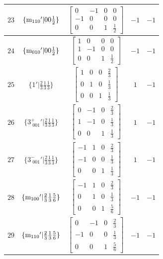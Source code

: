 \documentclass[fleqn,8pt]{jsarticle}
\begin{document}
\begin{longtable}{ccccc}
$ 23 $ & $ \{{\rm m}_{110}{}'|0 0 \frac{1}{2}\} $ & $ \begin{bmatrix} 0 & -1 & 0 & 0 \\ -1 & 0 & 0 & 0 \\ 0 & 0 & 1 & \frac{1}{2} \end{bmatrix} $ & $ -1 $ & $ -1 $ \\ \hline
$ 24 $ & $ \{{\rm m}_{010}{}'|0 0 \frac{1}{2}\} $ & $ \begin{bmatrix} 1 & 0 & 0 & 0 \\ 1 & -1 & 0 & 0 \\ 0 & 0 & 1 & \frac{1}{2} \end{bmatrix} $ & $ -1 $ & $ -1 $ \\ \hline
$ 25 $ & $ \{1{}'|\frac{2}{3} \frac{1}{3} \frac{1}{3}\} $ & $ \begin{bmatrix} 1 & 0 & 0 & \frac{2}{3} \\ 0 & 1 & 0 & \frac{1}{3} \\ 0 & 0 & 1 & \frac{1}{3} \end{bmatrix} $ & $ 1 $ & $ -1 $ \\ \hline
$ 26 $ & $ \{3^{+}_{\,\,001}{}'|\frac{2}{3} \frac{1}{3} \frac{1}{3}\} $ & $ \begin{bmatrix} 0 & -1 & 0 & \frac{2}{3} \\ 1 & -1 & 0 & \frac{1}{3} \\ 0 & 0 & 1 & \frac{1}{3} \end{bmatrix} $ & $ 1 $ & $ -1 $ \\ \hline
$ 27 $ & $ \{3^{-}_{\,\,001}{}'|\frac{2}{3} \frac{1}{3} \frac{1}{3}\} $ & $ \begin{bmatrix} -1 & 1 & 0 & \frac{2}{3} \\ -1 & 0 & 0 & \frac{1}{3} \\ 0 & 0 & 1 & \frac{1}{3} \end{bmatrix} $ & $ 1 $ & $ -1 $ \\ \hline
$ 28 $ & $ \{{\rm m}_{100}{}'|\frac{2}{3} \frac{1}{3} \frac{5}{6}\} $ & $ \begin{bmatrix} -1 & 1 & 0 & \frac{2}{3} \\ 0 & 1 & 0 & \frac{1}{3} \\ 0 & 0 & 1 & \frac{5}{6} \end{bmatrix} $ & $ -1 $ & $ -1 $ \\ \hline
$ 29 $ & $ \{{\rm m}_{110}{}'|\frac{2}{3} \frac{1}{3} \frac{5}{6}\} $ & $ \begin{bmatrix} 0 & -1 & 0 & \frac{2}{3} \\ -1 & 0 & 0 & \frac{1}{3} \\ 0 & 0 & 1 & \frac{5}{6} \end{bmatrix} $ & $ -1 $ & $ -1 $ \\ \hline

\end{longtable}
\end{document}
